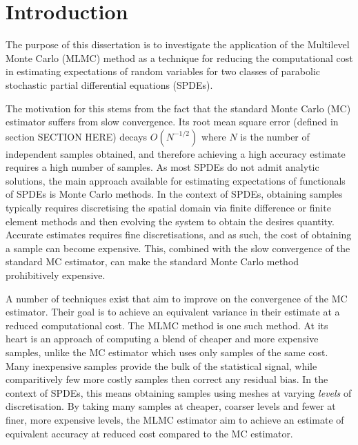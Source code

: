 \chapter{Introduction}

The purpose of this dissertation is to investigate the application of the 
Multilevel Monte Carlo (MLMC) method as a technique for reducing 
the computational cost in estimating expectations of random variables 
for two classes of parabolic stochastic partial differential equations (SPDEs).

The motivation for this stems from the fact that the standard Monte Carlo 
(MC) estimator suffers from slow convergence. Its root mean square error 
(defined in section SECTION HERE) decays $O(N^{-1/2})$ where $N$ is the number 
of independent samples obtained, and therefore achieving a high accuracy 
estimate requires a high number of samples. As most SPDEs do not admit 
analytic solutions, the main approach available for estimating expectations of 
functionals of SPDEs is Monte Carlo methods. In the context
of SPDEs, obtaining samples typically requires discretising 
the spatial domain via finite difference or finite element methods
and then evolving the system to obtain the desires quantity. Accurate 
estimates requires fine discretisations, and as such, the cost of obtaining 
a sample can become expensive. This, combined with the slow convergence of the 
standard MC estimator, can make the standard Monte Carlo method prohibitively
expensive.

A number of techniques exist that aim to improve on the convergence of 
the MC estimator. Their goal is to achieve an equivalent variance in their estimate 
at a reduced computational cost. The MLMC method is one such method. 
At its heart is an approach of computing a blend of cheaper and more expensive
samples, unlike the MC estimator which uses only samples of the same cost.
Many inexpensive samples provide the bulk of the statistical signal, 
while comparitively few more costly samples then correct any residual bias.
In the context of SPDEs, this means obtaining samples using meshes at 
varying \textit{levels} of discretisation. By taking many samples at cheaper,
coarser levels and fewer at finer, more expensive levels, the MLMC 
estimator aim to achieve an estimate of equivalent accuracy at reduced cost
compared to the MC estimator.

